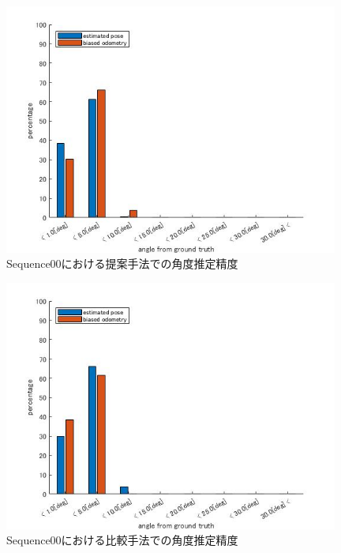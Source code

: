 \begin{figure}[htbp]
 \begin{minipage}{1.0\hsize}
  \begin{center}
   \includegraphics[width=110mm]{./picture/mesh_s0_rpy.jpg}
  \end{center}
  \caption{Sequence00における提案手法での角度推定精度}
  \label{fig:mesh_sequence00_RPY}
 \end{minipage}
\end{figure}

\begin{figure}[htbp]
 \begin{minipage}{1.0\hsize}
  \begin{center}
   \includegraphics[width=110mm]{./picture/point_s0_rpy.jpg}
  \end{center}
  \caption{Sequence00における比較手法での角度推定精度}
  \label{fig:point_sequence00_RPY}
 \end{minipage}
\end{figure}
 
